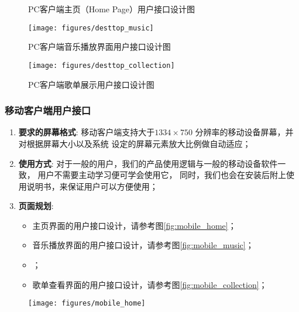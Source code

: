 \begin{enumerate}
\begin{figure}[h!]
  \caption{  \label{fig:desttop_home}
  		PC客户端主页（Home Page）用户接口设计图
    }
\end{figure}

\begin{figure}[h!]
  \centering
 
  \texttt{[image: figures/desttop\_music]}

  \caption{ \label{fig:desttop_music}
  		PC客户端音乐播放界面用户接口设计图
    }
\end{figure}

\begin{figure}[h!]
  \centering

  \texttt{[image: figures/desttop\_collection]}

  \caption{  \label{fig:desttop_collection}
  		PC客户端歌单展示用户接口设计图
    }
\end{figure}


\subsubsection{移动客户端用户接口} %

\begin{enumerate}
	\item \textbf{要求的屏幕格式}:
		移动客户端支持大于$1334 \times 750$ 分辨率的移动设备屏幕，并对根据屏幕大小以及系统
		设定的屏幕元素放大比例做自动适应；
	\item \textbf{使用方式}:
		对于一般的用户，我们的产品使用逻辑与一般的移动设备软件一致，
			用户不需要主动学习便可学会使用它，
		同时，我们也会在安装后附上使用说明书，来保证用户可以方便使用；
	\item \textbf{页面规划}:  
	\begin{itemize}
		\item 主页界面的用户接口设计，请参考图\ref{fig:mobile_home}；
		\item 音乐播放界面的用户接口设计，请参考图\ref{fig:mobile_music}；
		\item {}；
		\item 歌单查看界面的用户接口设计，请参考图\ref{fig:mobile_collection}；
	\end{itemize}
\end{enumerate}

\begin{figure}[h!]
  \centering

  \texttt{[image: figures/mobile\_home]}


\end{figure}
\end{enumerate}
